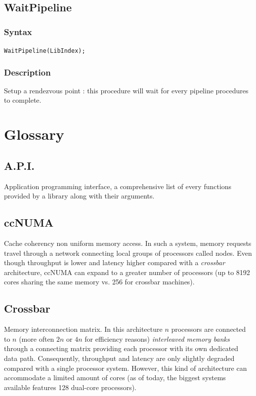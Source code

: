 \documentclass[a4paper,12pt]{article}
\begin{document}
\subsection{WaitPipeline}

\subsubsection*{Syntax}
\tt{WaitPipeline(LibIndex);}
\normalfont

\subsubsection*{Description}
Setup a rendezvous point : this procedure will wait for every pipeline procedures to complete.


%
%


\section{Glossary}

\subsection{A.P.I.}
Application programming interface, a comprehensive list of every functions provided by a library along with their arguments.

\subsection{ccNUMA}
Cache coherency non uniform memory access. In such a system, memory requests travel through a network connecting local groups of processors called nodes. Even though throughput is lower and latency higher compared with a \emph{crossbar} architecture, ccNUMA can expand to a greater number of processors (up to 8192 cores sharing the same memory vs. 256 for crossbar machines).

\subsection{Crossbar}
Memory interconnection matrix. In this architecture $n$ processors are connected to $n$ (more often $2n$ or $4n$ for efficiency reasons) \emph{interleaved memory banks} through a connecting matrix providing each processor with its own dedicated data path. Consequently, throughput and latency are only slightly degraded compared with a single processor system. However, this kind of architecture can accommodate a limited amount of cores (as of today, the biggest systems available features 128 dual-core processors).
\end{document}
